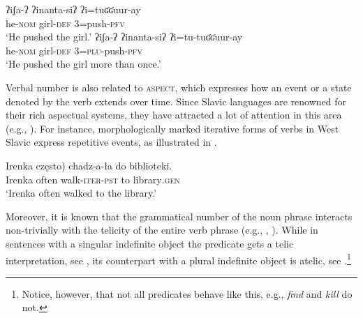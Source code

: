 \documentclass[output=paper]{langscibook}
\begin{document}
\ea\label{doc-wag:ex:pluractionality} \ea \gll ʔiʃa-ʔ ʔinanta-siʔ ʔi=tuʛʛuur-ay\\
he-\textsc{nom} girl-\textsc{def} \textsc{3}=push-\textsc{pfv}\\
\glt `He pushed the girl.'  
\ex \gll ʔiʃa-ʔ ʔinanta-siʔ ʔi=tu-tuʛʛuur-ay\\
he-\textsc{nom} girl-\textsc{def} \textsc{3}=\textsc{plu}-push-\textsc{pfv}\\
\glt `He pushed the girl more than once.' \\ \hfill \citep[Konso, Cushitic;][adapted]{orkaydo2013category}
\z 
\z

\noindent Verbal number is also related to \textsc{aspect}, which expresses how an event or a state denoted by the verb extends over time. Since Slavic languages are renowned for their rich aspectual systems, they have attracted a lot of attention in this area (e.g., \citealt{filip1999aspect, borik2006aspect}). For instance, morphologically marked iterative forms of verbs in West Slavic express repetitive events, as illustrated in .

\ea \gll Irenka \minsp{(} często) chadz-a-ła do biblioteki.\\
Irenka {} often walk-\textsc{iter}-\textsc{pst} to library\textsc{.gen}\\
\glt `Irenka often walked to the library.' \hfill \citep[Polish;][469, adapted]{pinon1997verbs}\label{doc-wag:ex:iterative}
\z

\noindent Moreover, it is known that the grammatical number of the noun phrase interacts non-trivially with the telicity of the entire verb phrase (e.g., \citealt{verkuyl1972compositional, krifka1998origins, de-swart2006aspectual}, ). While in sentences with a singular indefinite object the predicate gets a telic interpretation, see , its counterpart with a plural indefinite object is atelic, see .\footnote{Notice, however, that not all predicates behave like this, e.g., \textit{find} and \textit{kill} do not.}

\ea\label{doc-wag:ex:telicity}
\label{doc-wag:ex:telicity-singular} 
\label{doc-wag:ex:telicity-plural} 
\z 
\z 
\end{document}
